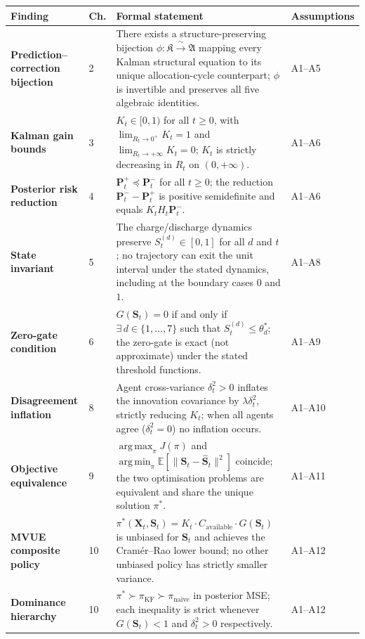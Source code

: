 \documentclass[12pt,openany]{book}
\newcommand{\E}{\mathbb{E}}
\newcommand{\bfP}{\mathbf{P}}
\numberwithin{equation}{chapter}
\theoremstyle{plain}
\theoremstyle{definition}
\theoremstyle{remark}
\DeclareMathOperator*{\argmax}{arg\,max}
\DeclareMathOperator*{\argmin}{arg\,min}
\renewcommand{\arraystretch}{1.2}
\def\mathcal#1{#1}%
\begin{document}
\smallskip
\begin{center}
\renewcommand{\arraystretch}{1.35}
\begin{tabularx}{\textwidth}{@{} >{\bfseries\small\RaggedRight}p{3.0cm} >{\small}p{0.7cm} >{\RaggedRight\small}p{10.49cm} >{\small\centering}p{1.5cm} @{}}
\toprule
\normalfont\textbf{Finding} &
\textbf{Ch.} &
\textbf{Formal statement} &
\textbf{Assumptions} \tabularnewline
\midrule
Prediction-- correction bijection &
2 &
There exists a structure-preserving bijection
$\phi\colon\mathfrak{K}\xrightarrow{\;\sim\;}\mathfrak{A}$
mapping every Kalman structural equation to its unique
allocation-cycle counterpart; $\phi$ is invertible and
preserves all five algebraic identities. &
A1--A5 \tabularnewline
Kalman gain bounds &
3 &
$K_t\in[0,1)$ for all $t\geq 0$, with
$\lim_{R_t\to 0^+}K_t = 1$ and
$\lim_{R_t\to+\infty}K_t = 0$;
$K_t$ is strictly decreasing in $R_t$ on $(0,+\infty)$. &
A1--A6 \tabularnewline
Posterior risk reduction &
4 &
$\bfP_t^+ \preceq \bfP_t^-$ for all $t\geq 0$; the
reduction $\bfP_t^- - \bfP_t^+$ is positive semidefinite
and equals $K_t H_t \bfP_t^-$. &
A1--A6 \tabularnewline
State invariant &
5 &
The charge/discharge dynamics preserve
$\mathcal{S}_t^{(d)}\in[0,1]$ for all $d$ and $t$; no
trajectory can exit the unit interval under the stated
dynamics, including at the boundary cases $0$ and $1$. &
A1--A8 \tabularnewline
Zero-gate condition &
6 &
$G(\mathbf{S}_t)=0$ if and only if
$\exists\,d\in\{1,\dots,7\}$ such that
$\mathcal{S}_t^{(d)}\leq\theta_d^*$; the zero-gate is
exact (not approximate) under the stated threshold
functions. &
A1--A9 \tabularnewline
Disagreement inflation &
8 &
Agent cross-variance $\delta_t^2>0$ inflates the
innovation covariance by $\lambda\delta_t^2$, strictly
reducing $K_t$; when all agents agree ($\delta_t^2=0$)
no inflation occurs. &
A1--A10 \tabularnewline
Objective equivalence &
9 &
$\argmax_\pi J(\pi)$ and
$\argmin_\pi \E[\|\mathbf{S}_t - \hat{\mathbf{S}}_t\|^2]$
coincide; the two optimisation
problems are equivalent and share the unique solution
$\pi^*$. &
A1--A11 \tabularnewline
MVUE composite policy &
10 &
$\pi^*(\mathbf{X}_t,\mathbf{S}_t)
= K_t \cdot C_{\mathrm{available}}
\cdot G(\mathbf{S}_t)$
is unbiased for $\mathbf{S}_t$ and achieves the
Cram\'{e}r--Rao lower bound; no other unbiased policy
has strictly smaller variance. &
A1--A12 \tabularnewline
Dominance hierarchy &
10 &
$\pi^*\succ\pi_{\mathrm{KF}}\succ\pi_{\mathrm{naive}}$
in posterior MSE; each inequality is strict whenever
$G(\mathbf{S}_t)<1$ and $\delta_t^2>0$ respectively. &
A1--A12 \tabularnewline
\bottomrule
\end{tabularx}
\end{center}
\end{document}
